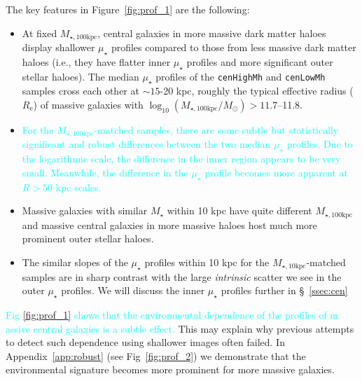 \documentclass[a4paper,fleqn,usenatbib]{mnras}
\def\rbcg{\texttt{cenHighMh}}
\def\nbcg{\texttt{cenLowMh}}
\def\mstar{{$M_{\star}$}}
\def\minn{{$M_{\star,10\mathrm{kpc}}$}}
\def\mtot{{$M_{\star,100\mathrm{kpc}}$}}
\def\logmtot{{$\log_{10} (M_{\star,100\mathrm{kpc}}/M_{\odot})$}}
\def\mden{{$\mu_{\star}$}}
\newcommand{\song}[1]{\textcolor{cyan}{#1}}
\begin{document}
    The key features in Figure~\ref{fig:prof_1} are the following:
    
    \begin{itemize}
        
        \item At fixed \mtot{}, central galaxies in more massive dark matter haloes 
            display shallower \mden{} profiles compared to those from less massive 
            dark matter haloes (i.e., they have flatter inner \mden{} profiles and 
            more significant outer stellar haloes). 
            The median \mden{} profiles of the \rbcg{} and \nbcg{} samples cross 
            each other at ${\sim} 15$-20 kpc, roughly the typical effective radius 
            ($R_{\mathrm{e}}$) of massive galaxies with \logmtot{}$>11.7$--11.8.  
            
        \item \song{
            For the \mtot{}-matched samples, there are some subtle but statistically 
            significant and robust differences between the two median \mden{} profiles.
            Due to the logarithmic scale, the difference in the inner region appears 
            to be very small. 
            Meanwhile, the difference in the \mden{} profile becomes more apparent 
            at $R>50$ kpc scales.  
            }
                                
        \item Massive galaxies with similar \mstar{} within 10 kpc have quite
            different \mtot{} and massive central galaxies in more massive haloes 
            host much more prominent outer stellar haloes. 
    
        \item The similar slopes of the \mden{} profiles within 10 kpc for the 
            \minn{}-matched samples are in sharp contrast with the large 
            \textit{intrinsic} scatter we see in the outer \mden{} profiles. 
            We will discuss the inner \mden{} profiles further in \S~\ref{ssec:cen}
                        
    \end{itemize}

    \song{
    Fig \ref{fig:prof_1} shows that the environmental dependence of the profiles of m
    assive central galaxies is a subtle effect.
    }
    This may explain why previous attempts to detect such dependence using 
    shallower images often failed. In Appendix~\ref{app:robust} (see Fig~\ref{fig:prof_2}) 
    we demonstrate that the environmental signature becomes more prominent for more massive 
    galaxies.
    
\end{document}
